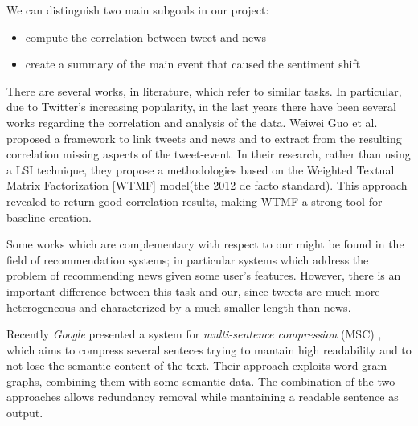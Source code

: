 We can distinguish two main subgoals in our project:
\begin{itemize}
	\item compute the correlation between tweet and news
	\item create a summary of the main event that caused the sentiment shift
\end{itemize}
There are several works, in literature, which refer to similar tasks. 
In particular, due to Twitter's increasing popularity, in the last years there
have been several works regarding the correlation and analysis of the data.
Weiwei Guo et al.\cite{LTN} proposed a framework to link tweets and news and to
extract from the resulting correlation missing aspects of the tweet-event. 
In their research, rather than using a LSI technique, they propose a
methodologies based on the Weighted Textual Matrix Factorization\cite{WTMF}
[WTMF] model(the 2012 de facto standard). This approach revealed to return
good correlation results, making WTMF a strong tool for baseline creation.

Some works which are complementary with respect to our might be found in the
field of recommendation systems; in particular systems which address the
problem of recommending news given some user's features. However, there is an
important difference between this task and our, since tweets are much more
heterogeneous and characterized by a much smaller length than news.

Recently \emph{Google} presented a system for \emph{multi-sentence compression} (MSC) \cite{MSC}, which aims
to compress several senteces trying to mantain high readability and to not lose
the semantic content of the text. Their approach exploits word gram graphs,
combining them with some semantic data. The combination of the two approaches
allows redundancy removal while mantaining a readable sentence as output.


